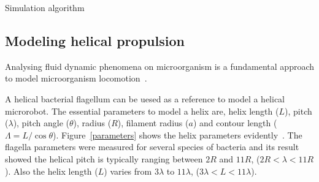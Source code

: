 \documentclass[12pt,a4paper,titlepage]{report}
\begin{document}
\begin{algorithm}[H]
 \caption[Simulation details]{Simulation algorithm}
\label{PSuedocode}
\end{algorithm}











\subsection{Modeling helical propulsion}\label{maths}

Analysing fluid dynamic phenomena on microorganism is a fundamental approach to model
 microorganism
 locomotion~\citep{smith2009boundary}.



A helical bacterial flagellum can be uesed as a reference to model a helical microrobot. The 
essential parameters to model a helix are, helix length ($L$), pitch ($\lambda$), pitch angle ($\theta$), 
radius ($R$), filament radius ($a$) and contour length ($\Lambda = L/ \cos \theta$). Figure~\ref{parameters} shows
the helix parameters evidently~\citep{rodenborn2013propulsion}. The flagella parameters were measured for
 several species of bacteria and its result showed the helical pitch is typically ranging between $2R$ and
$11R$, ($2R < \lambda < 11R$). Also the helix length ($L$) varies from $3\lambda$ to $11\lambda$, 
($3\lambda < L < 11\lambda$).
\end{document}
